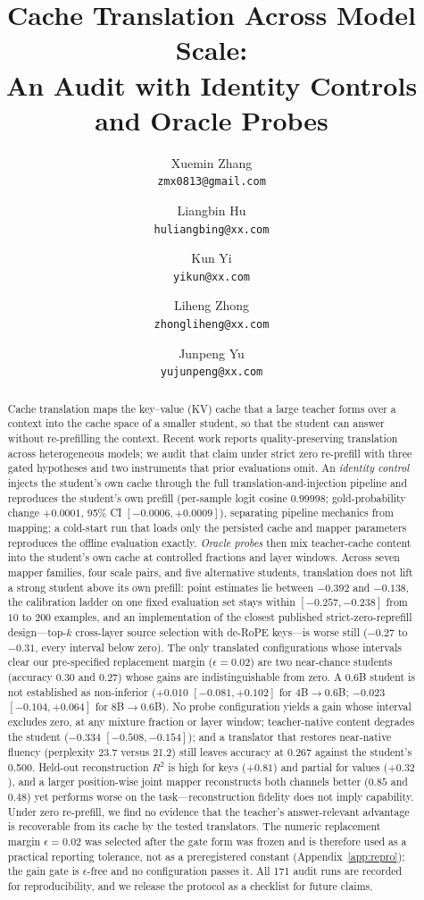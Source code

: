 \documentclass[10pt]{article}
\title{Cache Translation Across Model Scale:\\
An Audit with Identity Controls and Oracle Probes}
\author[1]{Xuemin Zhang\\\texttt{\small zmx0813@gmail.com}}
\author[1]{Liangbin Hu\\\texttt{\small huliangbing@xx.com}}
\author[1]{Kun Yi\\\texttt{\small yikun@xx.com}}
\author[1]{Liheng Zhong\\\texttt{\small zhongliheng@xx.com}}
\author[1]{Junpeng Yu\\\texttt{\small yujunpeng@xx.com}}
\affil[1]{CETC}
\date{}
\begin{document}
\maketitle

\begin{abstract}
Cache translation maps the key--value (KV) cache that a large teacher forms
over a context into the cache space of a smaller student, so that the student
can answer without re-prefilling the context. Recent work reports
quality-preserving translation across heterogeneous models; we audit that claim
under strict zero re-prefill with three gated hypotheses and two instruments
that prior evaluations omit. An \emph{identity control} injects the student's
own cache through the full translation-and-injection pipeline and reproduces
the student's own prefill (per-sample logit cosine $0.99998$; gold-probability
change $+0.0001$, 95\% CI $[-0.0006, +0.0009]$), separating pipeline mechanics
from mapping; a cold-start run that loads only the persisted cache and mapper
parameters reproduces the offline evaluation exactly. \emph{Oracle probes} then mix teacher-cache content into the
student's own cache at controlled fractions and layer windows. Across seven
mapper families, four scale pairs, and five alternative students, translation
does not lift a strong student above its own
prefill: point estimates lie between $-0.392$ and $-0.138$, the calibration
ladder on one fixed evaluation set stays within $[-0.257, -0.238]$ from $10$ to
$200$ examples, and an implementation of the closest published
strict-zero-reprefill design---top-$k$ cross-layer source selection with
de-RoPE keys---is worse still ($-0.27$ to $-0.31$, every interval below zero).
The only translated configurations whose intervals clear our pre-specified
replacement margin ($\epsilon{=}0.02$) are two near-chance students (accuracy
$0.30$ and $0.27$) whose gains are indistinguishable from zero. A 0.6B student is not established as
non-inferior ($+0.010$ $[-0.081, +0.102]$ for 4B$\to$0.6B; $-0.023$
$[-0.104, +0.064]$ for 8B$\to$0.6B). No probe configuration yields a gain whose
interval excludes zero, at any mixture fraction or layer window; teacher-native
content degrades the student ($-0.334$ $[-0.508, -0.154]$); and a translator
that restores near-native fluency (perplexity 23.7 versus 21.2) still leaves
accuracy at 0.267 against the student's 0.500. Held-out reconstruction $R^2$ is
high for keys ($+0.81$) and partial for values ($+0.32$), and a larger
position-wise joint mapper reconstructs both channels better ($0.85$ and $0.48$)
yet performs worse on the task---reconstruction fidelity does not imply
capability. Under zero
re-prefill, we find no evidence that the teacher's answer-relevant advantage is
recoverable from its cache by the tested translators. The numeric replacement margin $\epsilon{=}0.02$ was selected after the gate form was frozen and is therefore used as a practical reporting tolerance, not as a preregistered constant (Appendix~\ref{app:repro}); the gain gate is $\epsilon$-free and no configuration passes it. All 171 audit runs are
recorded for reproducibility, and we release the protocol as a checklist for
future claims.
\end{abstract}
\end{document}
